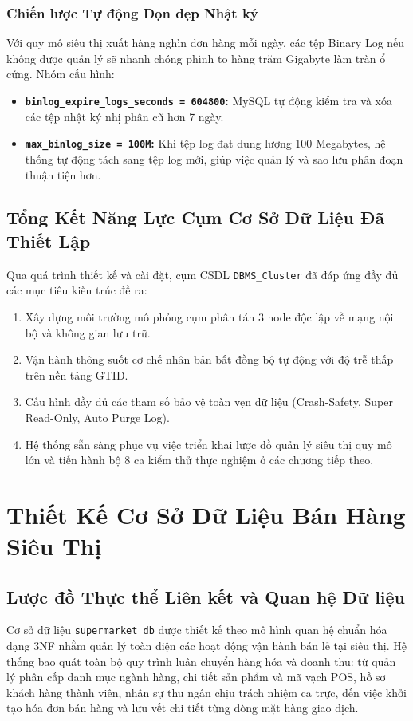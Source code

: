 \documentclass[12pt,a4paper]{report}
\begin{document}
\subsection{Chiến lược Tự động Dọn dẹp Nhật ký}
Với quy mô siêu thị xuất hàng nghìn đơn hàng mỗi ngày, các tệp Binary Log nếu không được quản lý sẽ nhanh chóng phình to hàng trăm Gigabyte làm tràn ổ cứng. Nhóm cấu hình:
\begin{itemize}
    \item \textbf{\texttt{binlog\_expire\_logs\_seconds = 604800}:}  MySQL tự động kiểm tra và xóa các tệp nhật ký nhị phân cũ hơn 7 ngày.
    \item \textbf{\texttt{max\_binlog\_size = 100M}:} Khi tệp log đạt dung lượng 100 Megabytes, hệ thống tự động tách sang tệp log mới, giúp việc quản lý và sao lưu phân đoạn thuận tiện hơn.
\end{itemize}

\section{Tổng Kết Năng Lực Cụm Cơ Sở Dữ Liệu Đã Thiết Lập}
Qua quá trình thiết kế và cài đặt, cụm CSDL \texttt{DBMS\_Cluster} đã đáp ứng đầy đủ các mục tiêu kiến trúc đề ra:
\begin{enumerate}
    \item Xây dựng môi trường mô phỏng cụm phân tán 3 node độc lập về mạng nội bộ và không gian lưu trữ.
    \item Vận hành thông suốt cơ chế nhân bản bất đồng bộ tự động với độ trễ thấp trên nền tảng GTID.
    \item Cấu hình đầy đủ các tham số bảo vệ toàn vẹn dữ liệu (Crash-Safety, Super Read-Only, Auto Purge Log).
    \item Hệ thống sẵn sàng phục vụ việc triển khai lược đồ quản lý siêu thị quy mô lớn và tiến hành bộ 8 ca kiểm thử thực nghiệm ở các chương tiếp theo.
\end{enumerate}

\chapter{Thiết Kế Cơ Sở Dữ Liệu Bán Hàng Siêu Thị}

\section{Lược đồ Thực thể Liên kết và Quan hệ Dữ liệu}
Cơ sở dữ liệu \texttt{supermarket\_db} được thiết kế theo mô hình quan hệ chuẩn hóa dạng 3NF nhằm quản lý toàn diện các hoạt động vận hành bán lẻ tại siêu thị. Hệ thống bao quát toàn bộ quy trình luân chuyển hàng hóa và doanh thu: từ quản lý phân cấp danh mục ngành hàng, chi tiết sản phẩm và mã vạch POS, hồ sơ khách hàng thành viên, nhân sự thu ngân chịu trách nhiệm ca trực, đến việc khởi tạo hóa đơn bán hàng và lưu vết chi tiết từng dòng mặt hàng giao dịch.
\end{document}
